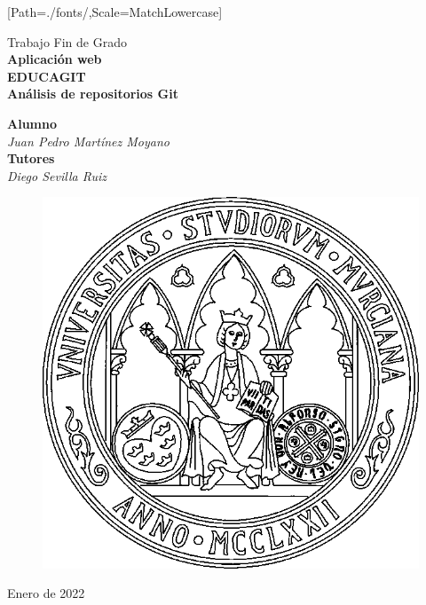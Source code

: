 \documentclass[spanish,11pt,twoside]{scrbook}
\begin{document}
\thispagestyle{empty}
\sloppy

\setmonofont{Inconsolata-Regular.ttf}[Path=./fonts/,Scale=MatchLowercase]

\begin{titlepage}
\thispagestyle{empty}
\vfill\vspace*{1cm}
\begin{center}
{\sc Trabajo Fin de Grado}\\
\vspace{.5cm}
{\huge\sf\bfseries Aplicación web}\\[0.2cm]
{\huge\sf\bfseries EDUCAGIT}\\[0.2cm]
{\huge\sf\bfseries Análisis de repositorios Git}\\[3.3cm]

\begin{large}
{\bf Alumno}\\
\emph{Juan Pedro Martínez Moyano}\\[1cm]

{\bf Tutores}\\
\emph{Diego Sevilla Ruiz} \\
\end{large}
\vfill
\begin{figure}[h!]
\centerline{\includegraphics[width=.35\textwidth]{escudoum.png}}
\end{figure}
\vfill
Enero de 2022
\end{center}
\end{titlepage}
\restoregeometry


\cleardoublepage



\cleardoublepage

\tableofcontents
\cleardoublepage
\end{document}

